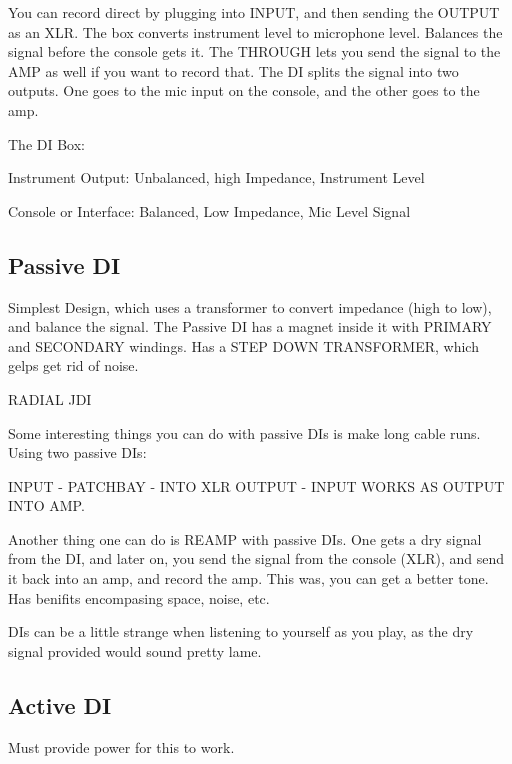 \documentclass{article}
\begin{document}
You can record direct by plugging into INPUT, and then sending the OUTPUT as an XLR. The box converts instrument level to microphone level. Balances the signal before the console gets it. The THROUGH lets you send the signal to the AMP as well if you want to record that. The DI splits the signal into two outputs. One goes to the mic input on the console, and the other goes to the amp. 

\medskip

The DI Box:

\medskip

Instrument Output: Unbalanced, high Impedance, Instrument Level

\medskip

Console or Interface: Balanced, Low Impedance, Mic Level Signal

\subsection{Passive DI}

Simplest Design, which uses a transformer to convert impedance (high to low), and balance the signal. The Passive DI has a magnet inside it with PRIMARY and SECONDARY windings. Has a STEP DOWN TRANSFORMER, which gelps get rid of noise.

\medskip

RADIAL JDI

\medskip

Some interesting things you can do with passive DIs is make long cable runs. Using two passive DIs:

\medskip

INPUT - PATCHBAY - INTO XLR OUTPUT - INPUT WORKS AS OUTPUT INTO AMP. 

\medskip

Another thing one can do is REAMP with passive DIs. One gets a dry signal from the DI, and later on, you send the signal from the console (XLR), and send it back into an amp, and record the amp. This was, you can get a better tone. Has benifits encompasing space, noise, etc.

\medskip

DIs can be a little strange when listening to yourself as you play, as the dry signal provided would sound pretty lame.

\subsection{Active DI}

Must provide power for this to work.
\end{document}
